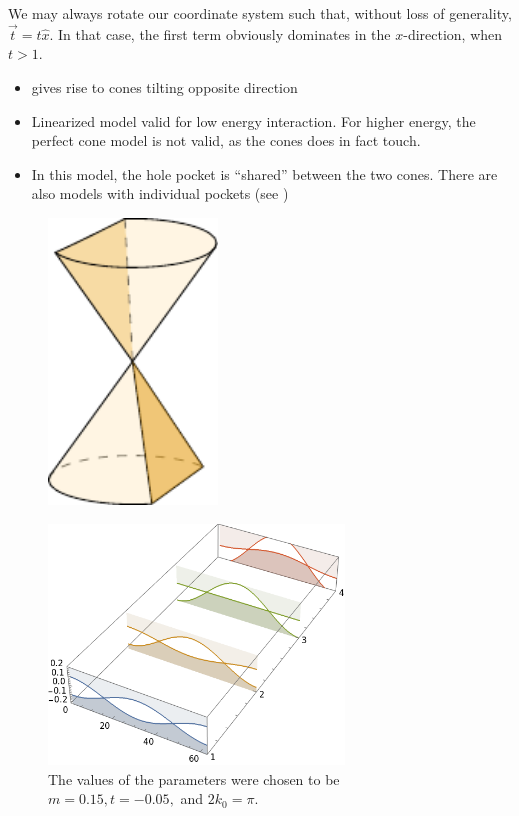 \begin{Proof}
  We may always rotate our coordinate system such that, without loss of generality, \(\vec{t} = t \hat{x}\).
  In that case, the first term obviously dominates in the \(x\)-direction, when $t>1$.
\end{Proof}

\begin{itemize}
  \item gives rise to cones tilting opposite direction
  \item Linearized model valid for low energy interaction. For higher energy, the perfect cone model is not valid, as the cones does in fact touch.
  \item In this model, the hole pocket is ``shared'' between the two cones. There are also models with individual pockets (see \cite{mccormickMinimalModelsTopological2017})
\end{itemize}

\begin{figure}[ht]
  \centering
  \includegraphics[width=0.4\textwidth]{figures/conicSection}
  \caption{\label{fig:conic-section-sketch} }
\end{figure}


\begin{figure}[ht]
  \centering
  \includegraphics[width=0.7\textwidth]{figures/typeIIridgeline}
  \caption{\label{fig:ridgeline}  The values of the parameters were chosen to be \(m=0.15, t=-0.05, \) and \(2 k_{0}=\pi\).}
\end{figure}

